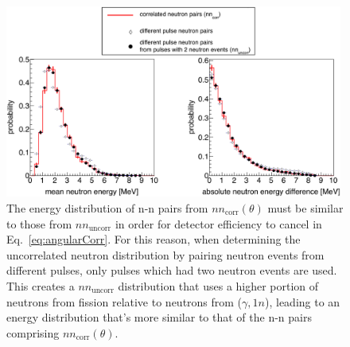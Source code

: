 \begin{figure}[]
\centering
    \includegraphics[width=0.99\textwidth]{Content/Methods/erg_dist(thesis).png}
    \caption{
    The energy distribution of n-n pairs from $nn_{\text{corr}}(\theta)$ must be similar to those from $nn_{\text{uncorr}}$ in order for detector efficiency to cancel in Eq.~\ref{eq:angularCorr}.
        For this reason, when determining the uncorrelated neutron distribution by pairing neutron events from different pulses, only pulses which had two neutron events are used.
    This creates a $nn_{\text{uncorr}}$ distribution that uses a higher portion of neutrons from fission relative to neutrons from ($\gamma, 1n$), leading to an energy distribution that's more similar to that of the n-n pairs comprising $nn_{\text{corr}}(\theta)$.
    }
    \label{fig:erg_distributions}
\end{figure}

